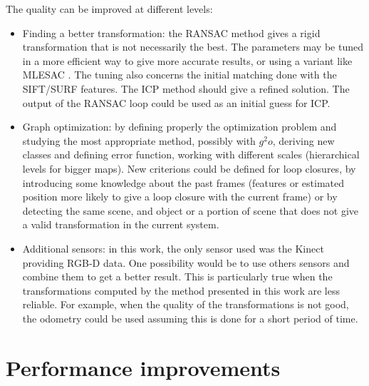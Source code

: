 The quality can be improved at different levels:
\begin{itemize}
\item Finding a better transformation: the \gls{RANSAC} method gives a rigid transformation that is not necessarily the best. The parameters may be tuned in a more efficient way to give more accurate results, or using a variant like MLESAC \cite{TorrZ00}. The tuning also concerns the initial matching done with the \gls{SIFT}/\gls{SURF} features. The \gls{ICP} \cite{zhang_92_icp} method should give a refined solution. The output of the \gls{RANSAC} loop could be used as an initial guess for \gls{ICP}. 
\item Graph optimization: by defining properly the optimization problem and studying the most appropriate method, possibly with $g^2o$, deriving new classes and defining error function, working with different scales (hierarchical levels for bigger maps). New criterions could be defined for loop closures, by introducing some knowledge about the past frames (features or estimated position more likely to give a loop closure with the current frame) or by detecting the same scene, and object or a portion of scene that does not give a valid transformation in the current system.
\item Additional sensors: in this work, the only sensor used was the Kinect providing RGB-D data. One possibility would be to use others sensors and combine them to get a better result. This is particularly true when the transformations computed by the method presented in this work are less reliable. For example, when the quality of the transformations is not good, the odometry could be used assuming this is done for a short period of time.
\end{itemize}

\section{Performance improvements}

